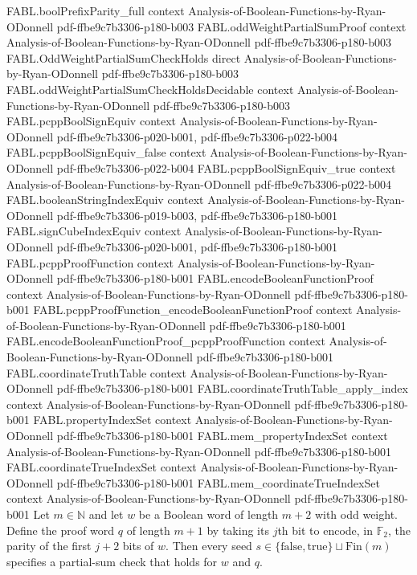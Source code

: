 \begin{theorem}
\proofstep
  {FABL.boolPrefixParity_full}
  {context}
  {Analysis-of-Boolean-Functions-by-Ryan-ODonnell}
  {pdf-ffbe9c7b3306-p180-b003}
\proofstep
  {FABL.oddWeightPartialSumProof}
  {context}
  {Analysis-of-Boolean-Functions-by-Ryan-ODonnell}
  {pdf-ffbe9c7b3306-p180-b003}
\proofstep
  {FABL.OddWeightPartialSumCheckHolds}
  {direct}
  {Analysis-of-Boolean-Functions-by-Ryan-ODonnell}
  {pdf-ffbe9c7b3306-p180-b003}
\proofstep
  {FABL.oddWeightPartialSumCheckHoldsDecidable}
  {context}
  {Analysis-of-Boolean-Functions-by-Ryan-ODonnell}
  {pdf-ffbe9c7b3306-p180-b003}
\proofstep
  {FABL.pcppBoolSignEquiv}
  {context}
  {Analysis-of-Boolean-Functions-by-Ryan-ODonnell}
  {pdf-ffbe9c7b3306-p020-b001,
    pdf-ffbe9c7b3306-p022-b004}
\proofstep
  {FABL.pcppBoolSignEquiv_false}
  {context}
  {Analysis-of-Boolean-Functions-by-Ryan-ODonnell}
  {pdf-ffbe9c7b3306-p022-b004}
\proofstep
  {FABL.pcppBoolSignEquiv_true}
  {context}
  {Analysis-of-Boolean-Functions-by-Ryan-ODonnell}
  {pdf-ffbe9c7b3306-p022-b004}
\proofstep
  {FABL.booleanStringIndexEquiv}
  {context}
  {Analysis-of-Boolean-Functions-by-Ryan-ODonnell}
  {pdf-ffbe9c7b3306-p019-b003,
    pdf-ffbe9c7b3306-p180-b001}
\proofstep
  {FABL.signCubeIndexEquiv}
  {context}
  {Analysis-of-Boolean-Functions-by-Ryan-ODonnell}
  {pdf-ffbe9c7b3306-p020-b001,
    pdf-ffbe9c7b3306-p180-b001}
\proofstep
  {FABL.pcppProofFunction}
  {context}
  {Analysis-of-Boolean-Functions-by-Ryan-ODonnell}
  {pdf-ffbe9c7b3306-p180-b001}
\proofstep
  {FABL.encodeBooleanFunctionProof}
  {context}
  {Analysis-of-Boolean-Functions-by-Ryan-ODonnell}
  {pdf-ffbe9c7b3306-p180-b001}
\proofstep
  {FABL.pcppProofFunction_encodeBooleanFunctionProof}
  {context}
  {Analysis-of-Boolean-Functions-by-Ryan-ODonnell}
  {pdf-ffbe9c7b3306-p180-b001}
\proofstep
  {FABL.encodeBooleanFunctionProof_pcppProofFunction}
  {context}
  {Analysis-of-Boolean-Functions-by-Ryan-ODonnell}
  {pdf-ffbe9c7b3306-p180-b001}
\proofstep
  {FABL.coordinateTruthTable}
  {context}
  {Analysis-of-Boolean-Functions-by-Ryan-ODonnell}
  {pdf-ffbe9c7b3306-p180-b001}
\proofstep
  {FABL.coordinateTruthTable_apply_index}
  {context}
  {Analysis-of-Boolean-Functions-by-Ryan-ODonnell}
  {pdf-ffbe9c7b3306-p180-b001}
\proofstep
  {FABL.propertyIndexSet}
  {context}
  {Analysis-of-Boolean-Functions-by-Ryan-ODonnell}
  {pdf-ffbe9c7b3306-p180-b001}
\proofstep
  {FABL.mem_propertyIndexSet}
  {context}
  {Analysis-of-Boolean-Functions-by-Ryan-ODonnell}
  {pdf-ffbe9c7b3306-p180-b001}
\proofstep
  {FABL.coordinateTrueIndexSet}
  {context}
  {Analysis-of-Boolean-Functions-by-Ryan-ODonnell}
  {pdf-ffbe9c7b3306-p180-b001}
\proofstep
  {FABL.mem_coordinateTrueIndexSet}
  {context}
  {Analysis-of-Boolean-Functions-by-Ryan-ODonnell}
  {pdf-ffbe9c7b3306-p180-b001}
Let $m\in\mathbb{N}$ and let $w$ be a Boolean word of length $m+2$ with odd weight.
Define the proof word $q$ of length $m+1$ by taking its $j$th bit to encode, in
$\mathbb{F}_2$, the parity of the first $j+2$ bits of $w$. Then every seed
$s\in\{\mathrm{false},\mathrm{true}\}\sqcup\mathrm{Fin}(m)$ specifies a partial-sum
check that holds for $w$ and $q$.
\end{theorem}

